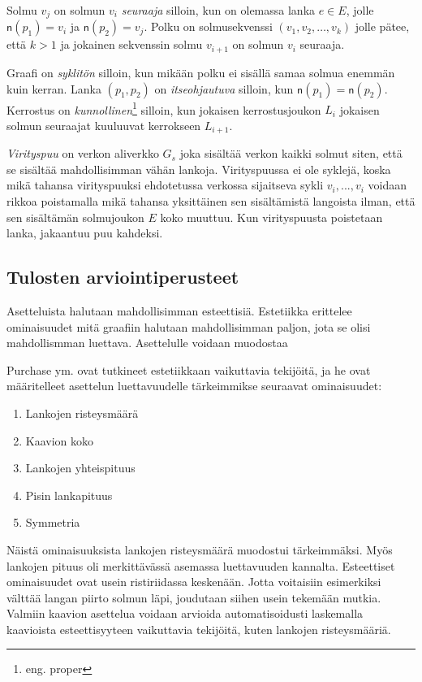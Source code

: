 \documentclass[finnish,12pt]{article}
\begin{document}
Solmu $v_j$ on solmun $v_i$ \emph{seuraaja} silloin, kun on olemassa lanka $e \in E$, jolle $\mathsf{n}(p_1) = v_i$ ja $\mathsf{n}(p_2) = v_j$.
Polku on solmusekvenssi $(v_1, v_2, \dots , v_k)$ jolle pätee, että $k>1$ ja jokainen sekvenssin solmu $v_{i+1}$ on solmun $v_i$ seuraaja.

Graafi on \emph{syklitön} silloin, kun mikään polku ei sisällä samaa solmua enemmän kuin kerran.
Lanka $(p_1, p_2)$ on \emph{itseohjautuva} silloin, kun $\mathsf{n}(p_1) = \mathsf{n}(p_2)$.
Kerrostus on \emph{kunnollinen}\footnote{eng. proper} silloin, kun jokaisen kerrostusjoukon $L_i$ jokaisen solmun seuraajat kuuluuvat kerrokseen $L_{i+1}$.

\emph{Virityspuu} on verkon aliverkko $G_s$ joka sisältää verkon kaikki solmut siten, että se sisältää mahdollisimman vähän lankoja.
Virityspuussa ei ole syklejä, koska mikä tahansa virityspuuksi ehdotetussa verkossa sijaitseva sykli $v_i, ... , v_i$ voidaan rikkoa poistamalla mikä tahansa yksittäinen sen sisältämistä langoista ilman, että sen sisältämän solmujoukon $E$ koko muuttuu.
Kun virityspuusta poistetaan lanka, jakaantuu puu kahdeksi.

 		\subsection{Tulosten arviointiperusteet}

Asetteluista halutaan mahdollisimman esteettisiä.
Estetiikka erittelee ominaisuudet mitä graafiin halutaan mahdollisimman paljon, jota se olisi mahdollismman luettava.
Asettelulle voidaan muodostaa 

Purchase ym. ovat tutkineet estetiikkaan vaikuttavia tekijöitä, ja he ovat määritelleet asettelun luettavuudelle tärkeimmikse seuraavat ominaisuudet: \cite{RefWorks:47} 
\begin{enumerate}
  \item Lankojen risteysmäärä
  \item Kaavion koko
  \item Lankojen yhteispituus
  \item Pisin lankapituus
  \item Symmetria
\end{enumerate}

Näistä ominaisuuksista lankojen risteysmäärä muodostui tärkeimmäksi. Myös lankojen pituus oli merkittävässä asemassa luettavuuden kannalta.
Esteettiset ominaisuudet ovat usein ristiriidassa keskenään.
Jotta voitaisiin esimerkiksi välttää langan piirto solmun läpi, joudutaan siihen usein tekemään mutkia.
Valmiin kaavion asettelua voidaan arvioida automatisoidusti laskemalla kaavioista esteettisyyteen vaikuttavia tekijöitä, kuten lankojen risteysmääriä.
\end{document}
